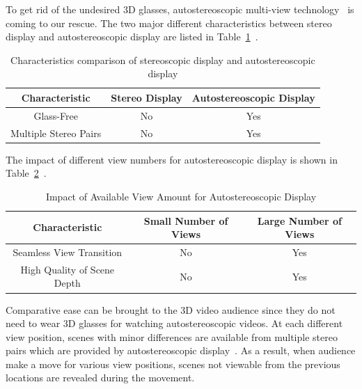 To get rid of the undesired 3D glasses,
autostereoscopic multi-view technology~\parencite{RN153} is coming to
our rescue.
The two major different characteristics between stereo display and
autostereoscopic display are
listed in Table~\ref{tab:diff-stereo-autostereo}~\parencite{RN44}.
\begin{table}[b]
    \caption{Characteristics comparison of stereoscopic display and autostereoscopic display}
    \bigskip\label{tab:diff-stereo-autostereo}
    \centering
    \begin{tabular}{c c c}
        \toprule
        Characteristic & Stereo Display & Autostereoscopic Display\\
        \midrule
        Glass-Free & No & Yes \\
        Multiple Stereo Pairs & No & Yes \\
        \bottomrule
    \end{tabular}
\end{table}
The impact of different view numbers for autostereoscopic display is shown in
Table~\ref{tab:autostereo-less-views-more-views}~\parencite{RN44}.
\begin{table}
    \caption{Impact of Available View Amount for Autostereoscopic Display}
    \bigskip\label{tab:autostereo-less-views-more-views}
    \centering
    \begin{tabular}{c c c}
        \toprule
        Characteristic & Small Number of Views & Large Number of Views \\
        \midrule
        Seamless View Transition  & No & Yes \\
        High Quality of Scene Depth & No & Yes \\
        \bottomrule
    \end{tabular}
\end{table}
Comparative ease can be brought to the 3D video audience
since they do not need to wear 3D glasses for watching autostereoscopic videos.
At each different view position, scenes with minor differences are available
from multiple stereo pairs which are provided by autostereoscopic
display~\parencite{RN44}.
As a result, when audience make a move for various view positions, scenes
not viewable from the previous locations are revealed during the movement.
